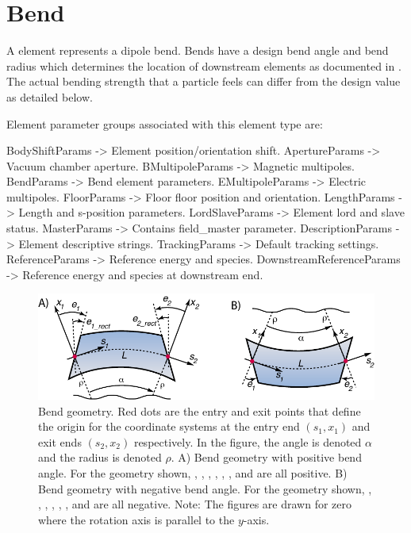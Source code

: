 \newpage

\section{Bend}
\label{s:bend}

A  element represents a dipole bend. Bends have a design bend angle and bend radius
which determines the location of downstream elements as documented in .
The actual bending strength that a particle feels can differ from the design value as detailed
below.

Element parameter groups associated with this element type are:
\TOPrule
\begin{example}
  BodyShiftParams     -> Element position/orientation shift.  
  ApertureParams      -> Vacuum chamber aperture.  
  BMultipoleParams    -> Magnetic multipoles.  
  BendParams          -> Bend element parameters.  
  EMultipoleParams    -> Electric multipoles.  
  FloorParams -> Floor floor position and orientation.  
  LengthParams        -> Length and s-position parameters.  
  LordSlaveParams     -> Element lord and slave status.  
  MasterParams        -> Contains field_master parameter.  
  DescriptionParams   -> Element descriptive strings.  
  TrackingParams      -> Default tracking settings.  
  ReferenceParams     -> Reference energy and species. 
  DownstreamReferenceParams -> Reference energy and species at downstream end. 
\end{example}
\BOTTOMrule


\begin{figure}[ht]
  \centering \includegraphics{bend.pdf} 
\caption[Bend geometry]{
Bend geometry. Red dots are the entry and exit points that define the origin for the
coordinate systems at the entry end $(s_1, x_1)$ and exit ends $(s_2, x_2)$ respectively. 
In the figure, the angle  is denoted $\alpha$ and the radius
 is denoted $\rho$.
A) Bend geometry with positive bend angle. For the geometry shown, 
, , , , , , and  are all positive.
B) Bend geometry with negative bend angle. For the geometry shown, 
, , , , , , and  are all negative.
Note: The figures are drawn for zero  where the rotation axis is parallel to the 
$y$-axis. 
}
\label{f:bend2}
\end{figure}

